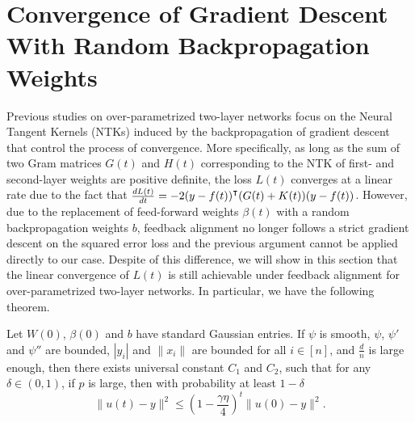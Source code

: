 \section{Convergence of Gradient Descent With Random Backpropagation Weights}

Previous studies on over-parametrized two-layer networks \citep{du2018gradient,gao2020model} focus on the Neural Tangent Kernels (NTKs) induced by the backpropagation of gradient descent that control the process of convergence. More specifically, as long as the sum of two Gram matrices $G(t)$ and $H(t)$ corresponding to the NTK of first- and second-layer weights are positive definite, the loss $L(t)$ converges at a linear rate due to the fact that $\frac{\diff L(t)}{\diff t} = -2 (y - f(t))\transpose(G(t) + K(t))(y - f(t))$. However, due to the replacement of feed-forward weights $\beta(t)$ with a random backpropagation weights $b$, feedback alignment no longer follows a strict gradient descent on the squared error loss and the previous argument cannot be applied directly to our case. Despite of this difference, we will show in this section that the linear convergence of $L(t)$ is still achievable under feedback alignment for over-parametrized two-layer networks. In particular, we have the following theorem.
\begin{theorem}[informal]
Let $W(0)$, $\beta(0)$ and $b$ have \iid standard Gaussian entries. If $\psi$ is smooth, $\psi$, $\psi'$ and $\psi''$ are bounded, $|y_i|$ and $\|x_i\|$ are bounded for all $i\in[n]$, and $\frac{d}{n}$ is large enough, then there exists universal constant $C_1$ and $C_2$, such that for any $\delta\in(0,1)$, if $p$ is large, then with probability at least $1-\delta$
\begin{equation*}
    \|u(t)-y\|^2 \leq (1-\frac{\gamma\eta}{4})^t\|u(0)-y\|^2.
\end{equation*}
\end{theorem}

